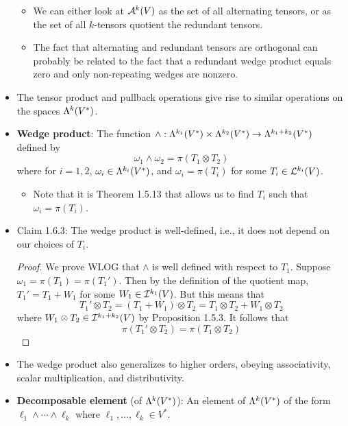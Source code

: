 \documentclass[../notes.tex]{subfiles}
\begin{document}
\begin{itemize}
    \begin{itemize}
        \item We can either look at $\alt[k]{V}$ as the set of all alternating tensors, or as the set of all $k$-tensors quotient the redundant tensors.
        \item The fact that alternating and redundant tensors are orthogonal can probably be related to the fact that a redundant wedge product equals zero and only non-repeating wedges are nonzero.
    \end{itemize}
    \item The tensor product and pullback operations give rise to similar operations on the spaces $\lam[k]{V^*}$.
    \item \textbf{Wedge product}: The function $\wedge:\lam[k_1]{V^*}\times\lam[k_2]{V^*}\to\lam[k_1+k_2]{V^*}$ defined by
    \begin{equation*}
        \omega_1\wedge\omega_2 = \pi(T_1\otimes T_2)
    \end{equation*}
    where for $i=1,2$, $\omega_i\in\lam[k_i]{V^*}$, and $\omega_i=\pi(T_i)$ for some $T_i\in\lin[k_i]{V}$.
    \begin{itemize}
        \item Note that it is Theorem 1.5.13 that allows us to find $T_i$ such that $\omega_i=\pi(T_i)$.
    \end{itemize}
    \item Claim 1.6.3: The wedge product is well-defined, i.e., it does not depend on our choices of $T_i$.
    \begin{proof}
        We prove WLOG that $\wedge$ is well defined with respect to $T_1$. Suppose $\omega_1=\pi(T_1)=\pi(T_1')$. Then by the definition of the quotient map, $T_1'=T_1+W_1$ for some $W_1\in\ide[k_1]{V}$. But this means that
        \begin{equation*}
            T_1'\otimes T_2 = (T_1+W_1)\otimes T_2
            = T_1\otimes T_2+W_1\otimes T_2
        \end{equation*}
        where $W_1\otimes T_2\in\ide[k_1+k_2]{V}$ by Proposition 1.5.3. It follows that
        \begin{equation*}
            \pi(T_1'\otimes T_2) = \pi(T_1\otimes T_2)
        \end{equation*}
    \end{proof}
    \item The wedge product also generalizes to higher orders, obeying associativity, scalar multiplication, and distributivity.
    \item \textbf{Decomposable element} (of $\lam[k]{V^*}$): An element of $\lam[k]{V^*}$ of the form $\ell_1\wedge\cdots\wedge\ell_k$ where $\ell_1,\dots,\ell_k\in V^*$.

\end{itemize}
\end{document}
